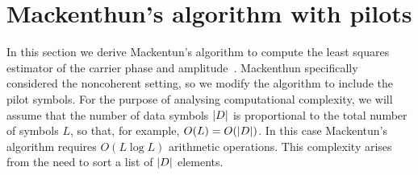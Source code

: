\documentclass[draftcls, onecolumn, 11pt]{IEEEtran}
\begin{document}
\section{Mackenthun's algorithm with pilots}\label{sec:least-squar-estim}

In this section we derive Mackentun's algorithm to compute the least squares estimator of the carrier phase and amplitude~\cite{Mackenthun1994}.  Mackenthun specifically considered the noncoherent setting, so we modify the algorithm to include the pilot symbols.  For the purpose of analysing computational complexity, we will assume that the number of data symbols ${\left\vert D \right\vert}$ is proportional to the total number of symbols $L$, so that, for example, $O(L) = O({\left\vert D \right\vert})$.  In this case Mackentun's algorithm requires $O(L \log L)$ arithmetic operations.  This complexity arises from the need to sort a list of ${\left\vert D \right\vert}$ elements.  

\end{document}
